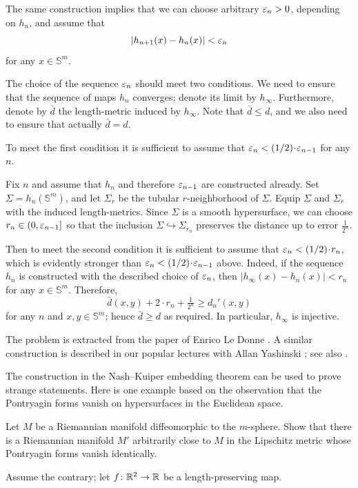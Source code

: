 The same construction implies that we can choose arbitrary $\varepsilon_n>0$, depending on $h_n$,
and assume that
\[|h_{n+1}(x)-h_n(x)|<\varepsilon_n\] for any $x\in \mathbb{S}^m$.

The choice of the sequence $\varepsilon_n$ should meet two conditions.
We need to ensure that the sequence of maps $h_n$ converges;
denote its limit by $h_\infty$.
Furthermore, denote by $\bar d$ the length-metric induced by $h_\infty$.
Note that $\bar d\le d$, and we also need to ensure that actually $\bar d=d$.

To meet the first condition it is sufficient to assume that $\eps_{n}< \tfrac1{2}\cdot \eps_{n-1}$ for any $n$.

Fix $n$ and assume that $h_n$ and therefore $\varepsilon_{n-1}$ are constructed already.
Set $\Sigma=h_n(\mathbb{S}^m)$, and let $\Sigma_r$ be the tubular $r$-neighborhood of $\Sigma$.
Equip $\Sigma$ and $\Sigma_r$ with the induced length-metrics.
Since $\Sigma$ is a smooth hypersurface, we can choose $r_n\in(0,\varepsilon_{n-1}]$ so that the inclusion $\Sigma\hookrightarrow \Sigma_{r_n}$ preserves the distance up to error $\tfrac1{2^n}$.

Then to meet the second condition it is sufficient to assume that $\eps_n< \tfrac12\cdot r_n$, which is evidently stronger than $\eps_{n}< \tfrac1{2}\cdot \eps_{n-1}$ above.
Indeed, if the sequence $h_n$ is constructed with the described choice of $\varepsilon_n$,
then $|h_\infty(x)-h_n(x)|<r_n$ for any $x\in\mathbb{S}^m$.
Therefore,
\[\bar d(x,y)+2\cdot r_n+\tfrac1{2^n}\ge d_n'(x,y)\] 
for any $n$ and $x,y\in \mathbb{S}^m$;
hence $\bar d\ge d$ as required. In particular, $h_\infty$ is injective.
\qeds

The problem is extracted from the paper of Enrico Le Donne \cite{le-donne}.
A similar construction is described in our popular lectures with Allan Yashinski \cite{petrunin-yashinsky}; see also \cite{petrunin-paths}.

The construction in the Nash--Kuiper embedding theorem
can be used to prove strange statements.
Here is one example based on the observation that the Pontryagin forms
vanish on hypersurfaces in the Euclidean space.

\begin{pr}
Let $M$ be a Riemannian manifold diffeomorphic to the $m$-sphere.
Show that there is a Riemannian manifold $M'$ arbitrarily close to $M$ in the Lipschitz metric whose Pontryagin forms vanish identically.
\end{pr}

Assume the contrary;
let $f\colon\mathbb{R}^2\to \mathbb{R}$ be a length-preserving map.


